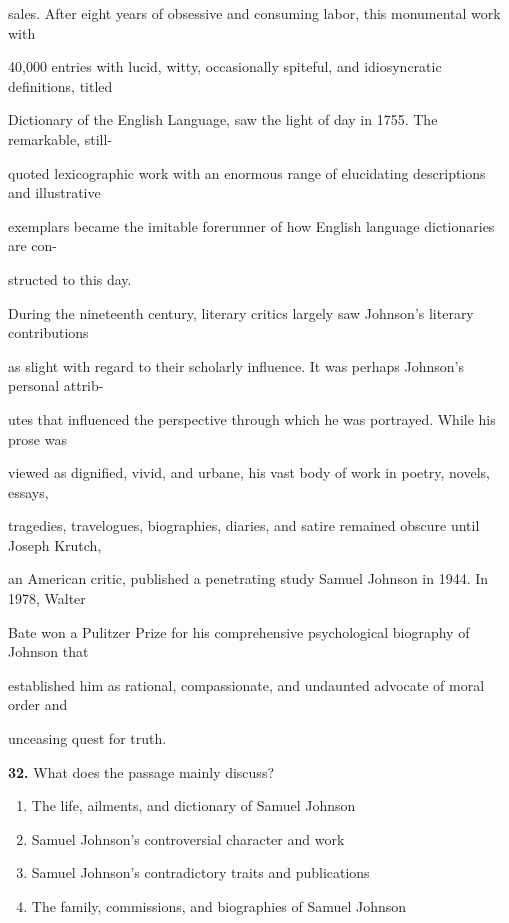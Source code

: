 \documentclass[12pt]{article}
\begin{document}
sales. After eight years of obsessive and consuming labor, this monumental work with\par
40,000 entries with lucid, witty, occasionally spiteful, and idiosyncratic definitions, titled\par
Dictionary of the English Language, saw the light of day in 1755. The remarkable, still-\par
quoted lexicographic work with an enormous range of elucidating descriptions and illustrative\par
exemplars became the imitable forerunner of how English language dictionaries are con-\par
structed to this day.\par
During the nineteenth century, literary critics largely saw Johnson's literary contributions\par
as slight with regard to their scholarly influence. It was perhaps Johnson's personal attrib-\par
utes that influenced the perspective through which he was portrayed. While his prose was\par
viewed as dignified, vivid, and urbane, his vast body of work in poetry, novels, essays,\par
tragedies, travelogues, biographies, diaries, and satire remained obscure until Joseph Krutch,\par
an American critic, published a penetrating study Samuel Johnson in 1944. In 1978, Walter\par
Bate won a Pulitzer Prize for his comprehensive psychological biography of Johnson that\par
established him as rational, compassionate, and undaunted advocate of moral order and\par
unceasing quest for truth.\par
\endgroup
\medskip
\noindent\textbf{32.} What does the passage mainly discuss?
\begin{enumerate}[label=(\Alph*),leftmargin=*,itemsep=0.2em]
\item The life, ailments, and dictionary of Samuel Johnson
\item Samuel Johnson's controversial character and work
\item Samuel Johnson's contradictory traits and publications
\item The family, commissions, and biographies of Samuel Johnson
\end{enumerate}
\par
\begingroup
\setlength{\parskip}{0pt}
\end{document}
